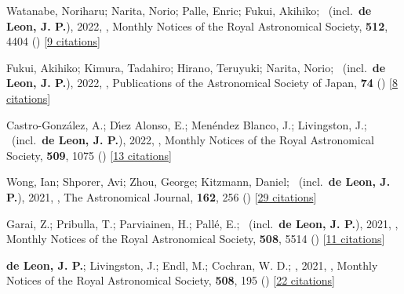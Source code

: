 \item[{\color{numcolor}\scriptsize44}] Watanabe, Noriharu; Narita, Norio; Palle, Enric; Fukui, Akihiko; \etal\ (incl.\ \textbf{de Leon, J. P.}), 2022, , Monthly Notices of the Royal Astronomical Society, \textbf{512}, 4404 () [\href{https://ui.adsabs.harvard.edu/abs/2022MNRAS.512.4404W}{9 citations}]

\item[{\color{numcolor}\scriptsize43}] Fukui, Akihiko; Kimura, Tadahiro; Hirano, Teruyuki; Narita, Norio; \etal\ (incl.\ \textbf{de Leon, J. P.}), 2022, , Publications of the Astronomical Society of Japan, \textbf{74} () [\href{https://ui.adsabs.harvard.edu/abs/2022PASJ...74L...1F}{8 citations}]

\item[{\color{numcolor}\scriptsize42}] Castro-Gonz{\'a}lez, A.; D{\'\i}ez Alonso, E.; Men{\'e}ndez Blanco, J.; Livingston, J.; \etal\ (incl.\ \textbf{de Leon, J. P.}), 2022, , Monthly Notices of the Royal Astronomical Society, \textbf{509}, 1075 () [\href{https://ui.adsabs.harvard.edu/abs/2022MNRAS.509.1075C}{13 citations}]

\item[{\color{numcolor}\scriptsize41}] Wong, Ian; Shporer, Avi; Zhou, George; Kitzmann, Daniel; \etal\ (incl.\ \textbf{de Leon, J. P.}), 2021, , The Astronomical Journal, \textbf{162}, 256 () [\href{https://ui.adsabs.harvard.edu/abs/2021AJ....162..256W}{29 citations}]

\item[{\color{numcolor}\scriptsize40}] Garai, Z.; Pribulla, T.; Parviainen, H.; Pall{\'e}, E.; \etal\ (incl.\ \textbf{de Leon, J. P.}), 2021, , Monthly Notices of the Royal Astronomical Society, \textbf{508}, 5514 () [\href{https://ui.adsabs.harvard.edu/abs/2021MNRAS.508.5514G}{11 citations}]

\item[{\color{numcolor}\scriptsize39}] \textbf{de Leon, J. P.}; Livingston, J.; Endl, M.; Cochran, W. D.; \etal, 2021, , Monthly Notices of the Royal Astronomical Society, \textbf{508}, 195 () [\href{https://ui.adsabs.harvard.edu/abs/2021MNRAS.508..195D}{22 citations}]

